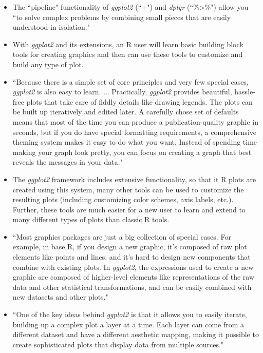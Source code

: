 \documentclass[pdftex,english,11pt,parskip=half]{scrartcl}
\begin{document}
\begin{itemize}
\item The ``pipeline" functionality of \textit{ggplot2} (``+") and \textit{dplyr} (``\%>\%") allow you ``to solve complex problems by combining small pieces that are easily understood in isolation." \cite{wickham2016ggplot2} 
\item With \textit{ggplot2} and its extensions, an R user will learn basic building block tools for creating graphics and then can use these tools to customize and build any type of plot. 
\item ``Because there is a simple set of core principles and very few special cases, \textit{ggplot2} is also easy to learn. ... Practically, \textit{ggplot2} provides beautiful, hassle-free plots that take care of fiddly details like drawing legends. The plots can be built up iteratively and edited later. A carefully chose set of defaults means that most of the time you can produce a publication-quality graphic in seconds, but if you do have special formatting requirements, a comprehensive theming system makes it easy to do what you want. Instead of spending time making your graph look pretty, you can focus on creating a graph that best reveals the messages in your data." \cite{wickham2016ggplot2} 
\item The \textit{ggplot2} framework includes extensive functionality, so that it R plots are created using this system, many other tools can be used to customize the resulting plots (including customizing color schemes, axis labels, etc.). Further, these tools are much easier for a new user to learn and extend to many different types of plots than classic R tools. 
\item ``Most graphics packages are just a big collection of special cases. For example, in base R, if you design a new graphic, it's composed of raw plot elements like points and lines, and it's hard to design new components that combine with existing plots. In \textit{ggplot2}, the expressions used to create a new graphic are composed of higher-level elements like representations of the raw data and other statistical transformations, and can be easily combined with new datasets and other plots." \cite{wickham2016ggplot2} 
\item ``One of the key ideas behind \textit{ggplot2} is that it allows you to easily iterate, building up a complex plot a layer at a time. Each layer can come from a different dataset and have a different aesthetic mapping, making it possible to create sophisticated plots that display data from multiple sources." \cite{wickham2016ggplot2} 

\end{itemize}
\end{document}
